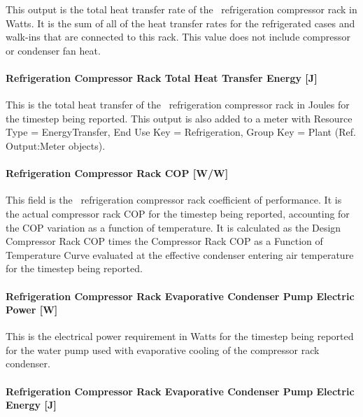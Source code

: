 This output is the total heat transfer rate of the~ refrigeration compressor rack in Watts. It is the sum of all of the heat transfer rates for the refrigerated cases and walk-ins that are connected to this rack. This value does not include compressor or condenser fan heat.

\paragraph{Refrigeration Compressor Rack Total Heat Transfer Energy {[}J{]}}\label{refrigeration-compressor-rack-total-heat-transfer-energy-j}

This is the total heat transfer of the~ refrigeration compressor rack in Joules for the timestep being reported. This output is also added to a meter with Resource Type = EnergyTransfer, End Use Key = Refrigeration, Group Key = Plant (Ref. Output:Meter objects).

\paragraph{Refrigeration Compressor Rack COP {[}W/W{]}}\label{refrigeration-compressor-rack-cop-ww}

This field is the~ refrigeration compressor rack coefficient of performance. It is the actual compressor rack COP for the timestep being reported, accounting for the COP variation as a function of temperature. It is calculated as the Design Compressor Rack COP times the Compressor Rack COP as a Function of Temperature Curve evaluated at the effective condenser entering air temperature for the timestep being reported.

\paragraph{Refrigeration Compressor Rack Evaporative Condenser Pump Electric Power {[}W{]}}\label{refrigeration-compressor-rack-evaporative-condenser-pump-electric-power-w}

This is the electrical power requirement in Watts for the timestep being reported for the water pump used with evaporative cooling of the compressor rack condenser.

\paragraph{Refrigeration Compressor Rack Evaporative Condenser Pump Electric Energy {[}J{]}}\label{refrigeration-compressor-rack-evaporative-condenser-pump-electric-energy-j}

